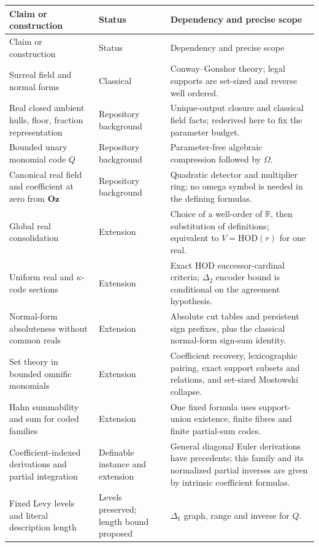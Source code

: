 \documentclass[11pt,a4paper]{article}
\numberwithin{equation}{section}
\theoremstyle{definition}
\theoremstyle{remark}
\newcommand{\Oz}{\mathbf{Oz}}
\newcommand{\HOD}{\mathrm{HOD}}
\newcommand{\R}{\mathbb R}
\begin{document}
\begingroup
\small
\setlength{\tabcolsep}{5pt}
\begin{longtable}{P{0.27\textwidth}P{0.18\textwidth}P{0.47\textwidth}}
\toprule
Claim or construction & Status & Dependency and precise scope\\
\midrule
\endfirsthead
\toprule
Claim or construction & Status & Dependency and precise scope\\
\midrule
\endhead
\bottomrule
\endfoot
Surreal field and normal forms & Classical &
Conway--Gonshor theory; legal supports are set-sized and reverse well
ordered.\\
Real closed ambient hulls, floor, fraction representation & Repository
background &
Unique-output closure and classical field facts; rederived here to fix
the parameter budget.\\
Bounded unary monomial code \(Q\) & Repository background &
Parameter-free algebraic compression followed by \(\Omega\).\\
Canonical real field and coefficient at zero from \(\Oz\) &
Repository background &
Quadratic detector and multiplier ring; no omega symbol is needed in
the defining formulas.\\
Global real consolidation & Extension &
Choice of a well-order of \(\R\), then substitution of definitions;
equivalent to \(V=\HOD(r)\) for one real.\\
Uniform real and \(\kappa\)-code sections & Extension &
Exact HOD successor-cardinal criteria; \(\Delta_2\) encoder bound is
conditional on the agreement hypothesis.\\
Normal-form absoluteness without common reals & Extension &
Absolute cut tables and persistent sign prefixes, plus the classical
normal-form sign-sum identity.\\
Set theory in bounded omnific monomials & Extension &
Coefficient recovery, lexicographic pairing, exact support subsets and
relations, and set-sized Mostowski collapse.\\
Hahn summability and sum for coded families & Extension &
One fixed formula uses support-union existence, finite fibres and
finite partial-sum codes.\\
Coefficient-indexed derivations and partial integration &
Definable instance and extension &
General diagonal Euler derivations have precedents; this family and its
normalized partial inverses are given by intrinsic coefficient formulas.\\
Fixed Levy levels and literal description length &
Levels preserved; length bound proposed &
\(\Delta_1\) graph, range and inverse for \(Q\).

\end{longtable}
\end{document}
